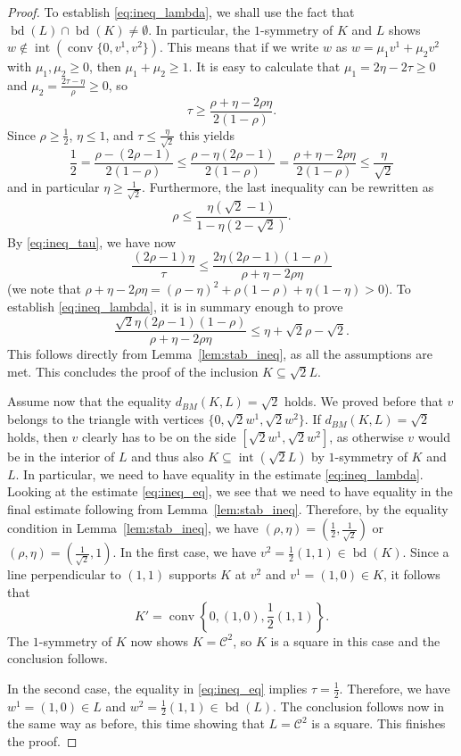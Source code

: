 \documentclass[12pt,a4paper]{article}
\theoremstyle{definition}
\DeclareMathOperator{\conv}{conv}
\DeclareMathOperator{\bd}{bd}
\DeclareMathOperator{\inte}{int}
\newcommand\CC{\mathcal{C}}
\begin{document}
\begin{proof}
To establish \eqref{eq:ineq_lambda}, we shall use the fact that $\bd(L) \cap \bd(K) \neq \emptyset$. In particular, the $1$-symmetry of $K$ and $L$ shows $w \not \in \inte(\conv\{ 0, v^1, v^2 \})$. This means that if we write $w$ as $w=\mu_1v^1 + \mu_2v^2$ with $\mu_1, \mu_2 \geq 0$, then $\mu_1 + \mu_2 \geq 1$. It is easy to calculate that $\mu_1 = 2 \eta - 2 \tau \geq 0$ and $\mu_2 = \frac{2\tau - \eta}{\rho} \geq 0$, so
\begin{equation}
\label{eq:ineq_tau}
\tau \geq \frac{\rho + \eta - 2\rho \eta}{2(1-\rho)}.
\end{equation}
Since $\rho \geq \frac{1}{2}$, $\eta \leq 1$, and $\tau \leq \frac{\eta}{\sqrt{2}}$ this yields
$$ \frac{1}{2} = \frac{\rho - (2 \rho - 1)}{2 (1 - \rho)} \leq \frac{\rho - \eta (2 \rho - 1)}{2 (1 - \rho)} = \frac{\rho + \eta - 2\rho \eta}{2(1-\rho)} \leq \frac{\eta}{\sqrt{2}}$$
and in particular $\eta \geq \frac{1}{\sqrt{2}}$. Furthermore, the last inequality can be rewritten as
$$ \rho \leq \frac{\eta (\sqrt{2} - 1)}{1 - \eta (2 - \sqrt{2})}. $$
By \eqref{eq:ineq_tau}, we have now
\begin{equation}
\label{eq:ineq_eq}
\frac{(2\rho-1)\eta}{\tau} \leq \frac{2\eta(2\rho-1)(1-\rho)}{\rho + \eta - 2\rho \eta}
\end{equation}
(we note that $\rho + \eta - 2\rho \eta=(\rho-\eta)^2 + \rho(1-\rho) + \eta(1-\eta)>0$). To establish \eqref{eq:ineq_lambda}, it is in summary enough to prove
$$\frac{\sqrt{2}\eta(2\rho-1)(1-\rho)}{\rho + \eta - 2\rho \eta} \leq \eta + \sqrt{2} \rho - \sqrt{2}.$$
This follows directly from Lemma~\ref{lem:stab_ineq}, as all the assumptions are met. This concludes the proof of the inclusion $K \subseteq \sqrt{2}L$.

Assume now that the equality $d_{BM}(K,L) = \sqrt{2}$ holds. We proved before that $v$ belongs to the triangle with vertices $\{0, \sqrt{2}w^1, \sqrt{2}w^2\}$. If $d_{BM}(K,L) = \sqrt{2}$ holds, then $v$ clearly has to be on the side $[\sqrt{2}w^1, \sqrt{2}w^2]$, as otherwise $v$ would be in the interior of $L$ and thus also $K \subseteq \inte(\sqrt{2}L)$ by $1$-symmetry of $K$ and $L$. In particular, we need to have equality in the estimate \eqref{eq:ineq_lambda}. Looking at the estimate \eqref{eq:ineq_eq}, we see that we need to have equality in the final estimate following from Lemma~\ref{lem:stab_ineq}. Therefore, by the equality condition in Lemma~\ref{lem:stab_ineq}, we have $(\rho, \eta)=\left ( \frac{1}{2}, \frac{1}{\sqrt{2}} \right )$ or $(\rho, \eta)=\left ( \frac{1}{\sqrt{2}}, 1 \right )$. In the first case, we have $v^2 = \frac{1}{2} (1,1) \in \bd(K)$. Since a line perpendicular to $(1,1)$ supports $K$ at $v^2$ and $v^1 = (1,0) \in K$, it follows that
$$ K'= \conv \left\{ 0, (1,0), \frac{1}{2} (1,1) \right\}. $$
The $1$-symmetry of $K$ now shows $K = \CC^2$, so $K$ is a square in this case and the conclusion follows.

In the second case, the equality in \eqref{eq:ineq_eq} implies $\tau=\frac{1}{2}$. Therefore, we have $w^1 = (1,0) \in L$ and $w^2 = \frac{1}{2} (1,1) \in \bd(L)$. The conclusion follows now in the same way as before, this time showing that $L=\CC^2$ is a square. This finishes the proof. 
\end{proof}
\end{document}
